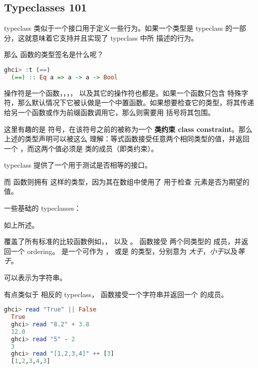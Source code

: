 \documentclass[./main.tex]{subfiles}
\begin{document}
\subsection*{Typeclasses 101}

typeclass 类似于一个接口用于定义一些行为。如果一个类型是 typeclass 的一部分，这就意味着它支持并且实现了 typeclass 中所
描述的行为。

那么 \acode{==} 函数的类型签名是什么呢？

\begin{lstlisting}[language=Haskell]
  ghci> :t (==)
  (==) :: Eq a => a -> a -> Bool
\end{lstlisting}

\begin{anote}
  \acode{==} 操作符是一个函数，\acode{+}，\acode{*}，\acode{-}，\acode{/} 以及其它的操作符也都是。如果一个函数只包含
  特殊字符，那么默认情况下它被认做是一个中置函数。如果想要检查它的类型，将其传递给另一个函数或作为前缀函数调用它，那么则需要用
  括号将其包围。
\end{anote}

这里有趣的是 \acode{=>} 符号，在该符号之前的被称为一个 \textbf{类约束 class constraint}。那么上述的类型声明可以被这么
理解：等式函数接受任意两个相同类型的值，并返回一个 ，而这两个值必须是  类的成员（即类约束）。

 typeclass 提供了一个用于测试是否相等的接口。

而  函数则拥有  这样的类型，因为其在数组中使用了 \acode{==} 用于检查
元素是否为期望的值。

一些基础的 typeclasses：

 如上所述。

 覆盖了所有标准的比较函数例如\acode{>}，\acode{<}，\acode{>=} 以及 \acode{<=}。 函数接受
两个同类型的  成员，并返回一个 ordering。 是一个可作为 ， 或是 
的类型，分别意为 \textit{大于}，\textit{小于}以及\textit{等于}。

 可以表示为字符串。

 有点类似于  相反的 typeclass， 函数接受一个字符串并返回一个  的成员。

\begin{lstlisting}[language=Haskell]
  ghci> read "True" || False
  True
  ghci> read "8.2" + 3.8
  12.0
  ghci> read "5" - 2
  3
  ghci> read "[1,2,3,4]" ++ [3]
  [1,2,3,4,3]
\end{lstlisting}
\end{document}
